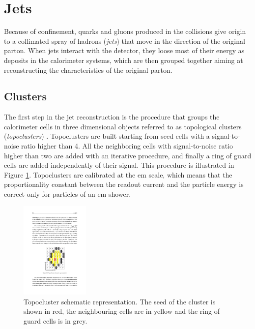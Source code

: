 \section{Jets}

Because of confinement, quarks and gluons produced in the collisions give origin to a collimated spray of hadrons (\textit{jets}) that move in the direction of the original parton. When jets interact with the detector, they loose most of their energy as deposits in the calorimeter systems, which are then grouped together aiming at reconstructing the characteristics of the original parton. 

\subsection{Clusters}
The first step in the jet reconstruction is the procedure that groups the calorimeter cells in three dimensional objects referred to as topological clusters (\textit{topoclusters}) \cite{Lampl:2008zz,Aad:2016upy}. Topoclusters are built starting from seed cells with a signal-to-noise ratio higher than 4. All the neighboring cells with signal-to-noise ratio higher than two are added with an iterative procedure, and finally a ring of guard cells are added independently of their signal. This procedure is illustrated in Figure \ref{fig:obj:topocluster}. Topoclusters are calibrated at the \gls{em} scale, which means that the proportionality constant between the readout current and the particle energy is correct only for particles of an \gls{em} shower.

\begin{figure}[h]
\begin{center}
\includegraphics[width=0.3\textwidth]{./figures/objects/topocluster.pdf}
\end{center}
\caption[Topocluster schematic representation]{Topocluster schematic representation. The seed of the cluster is shown in red, the neighbouring cells are in yellow and the ring of guard cells is in grey.}
\label{fig:obj:topocluster}
\end{figure}
 
